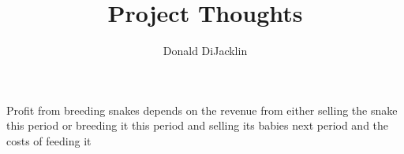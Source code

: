 \documentclass{article}
\begin{document}
\newcommand*{\be}{\mathbb{E}}
\newcommand*{\bv}{\mathbb{V}}
\lstset{showspaces = false, showstringspaces = false}
\linespread{2}
\title{Project Thoughts}
\author{Donald DiJacklin}
\maketitle
Profit from breeding snakes depends on the revenue from either selling the snake this period or breeding it this period and selling its babies next period and the costs of feeding it
\end{document}
